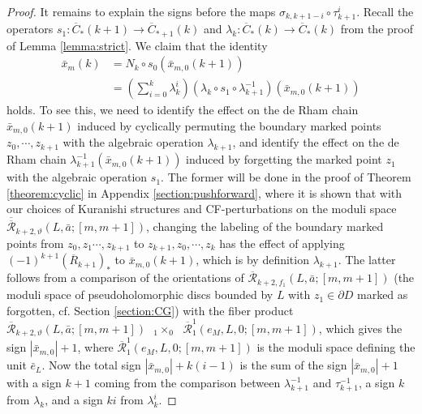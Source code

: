 \documentclass[a4paper]{article}
\numberwithin{equation}{section}
\begin{document}
\begin{proof}
It remains to explain the signs before the maps $\sigma_{k,k+1-i}\circ\tau_{k+1}^i$. Recall the operators $s_1:\overline{C}_\ast(k+1)\rightarrow\overline{C}_{\ast+1}(k)$ and $\lambda_k:\overline{C}_\ast(k)\rightarrow\overline{C}_\ast(k)$ from the proof of Lemma \ref{lemma:strict}. We claim that the identity
\begin{equation}\label{eq:lam}
\begin{split}
\bar{x}_m(k)&=N_k\circ s_0\left(\bar{x}_{m,0}(k+1)\right) \\
&=\left(\sum_{i=0}^{k}\lambda_{k}^i\right)(\lambda_{k}\circ s_1\circ\lambda_{k+1}^{-1})\left(\bar{x}_{m,0}(k+1)\right)
\end{split}
\end{equation}
holds. To see this, we need to identify the effect on the de Rham chain $\bar{x}_{m,0}(k+1)$ induced by cyclically permuting the boundary marked points $z_0,\cdots,z_{k+1}$ with the algebraic operation $\lambda_{k+1}$, and identify the effect on the de Rham chain $\lambda_{k+1}^{-1}\left(\bar{x}_{m,0}(k+1)\right)$ induced by forgetting the marked point $z_1$ with the algebraic operation $s_1$. The former will be done in the proof of Theorem \ref{theorem:cyclic} in Appendix \ref{section:pushforward}, where it is shown that with our choices of Kuranishi structures and CF-perturbations on the moduli space $\overline{\overline{\mathcal{R}}}_{k+2,\vartheta}(L,\bar{a};[m,m+1])$, changing the labeling of the boundary marked points from $z_0,z_1\cdots,z_{k+1}$ to $z_{k+1},z_0,\cdots,z_k$ has the effect of applying $(-1)^{k+1}(\overline{R}_{k+1})_\ast$ to $\bar{x}_{m,0}(k+1)$, which is by definition $\lambda_{k+1}$. The latter follows from a comparison of the orientations of $\overline{\mathcal{R}}_{k+2,f_1}(L,\bar{a};[m,m+1])$ (the moduli space of pseudoholomorphic discs bounded by $L$ with $z_1\in\partial D$ marked as forgotten, cf. Section \ref{section:CG}) with the fiber product $\overline{\mathcal{R}}_{k+2,\vartheta}(L,\bar{a};[m,m+1])\textrm{ }{{}_1\times_0}\textrm{ }\overline{\mathcal{R}}_1^1(e_M,L,0;[m,m+1])$, which gives the sign $|\bar{x}_{m,0}|+1$, where $\overline{\mathcal{R}}_1^1(e_M,L,0;[m,m+1])$ is the moduli space defining the unit $\bar{e}_L$. Now the total sign $|\bar{x}_{m,0}|+k(i-1)$ is the sum of the sign $|\bar{x}_{m,0}|+1$ with a sign $k+1$ coming from the comparison between $\lambda_{k+1}^{-1}$ and $\tau_{k+1}^{-1}$, a sign $k$ from $\lambda_k$, and a sign $ki$ from $\lambda_k^i$.
\end{proof}
	
\end{document}
